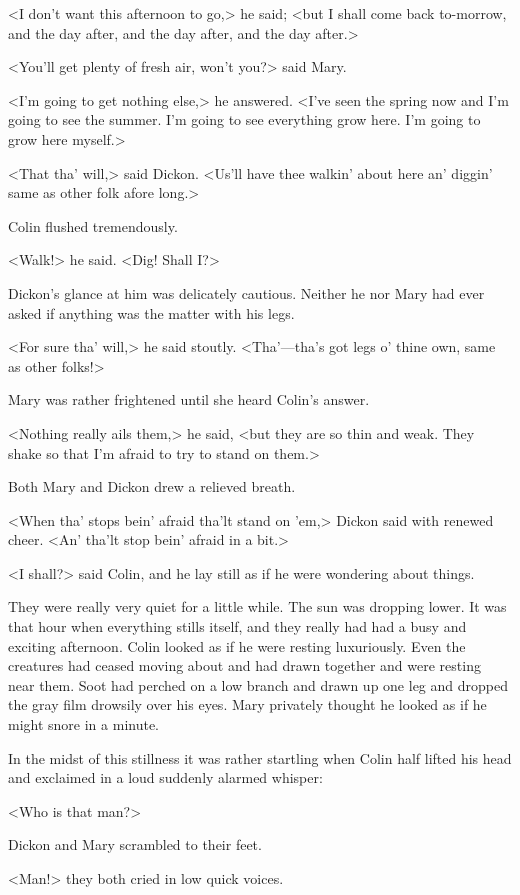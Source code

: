 <I don't want this afternoon to go,> he said; <but I shall come back to-morrow, and the day after, and the day after, and the day after.>

<You'll get plenty of fresh air, won't you?> said Mary.

<I'm going to get nothing else,> he answered. <I've seen the spring now and I'm going to see the summer. I'm going to see everything grow here. I'm going to grow here myself.>

<That tha' will,> said Dickon. <Us'll have thee walkin' about here an' diggin' same as other folk afore long.>

Colin flushed tremendously.

<Walk!> he said. <Dig! Shall I\@?>

Dickon's glance at him was delicately cautious. Neither he nor Mary had ever asked if anything was the matter with his legs.

<For sure tha' will,> he said stoutly. <Tha'—tha's got legs o' thine own, same as other folks!>

Mary was rather frightened until she heard Colin's answer.

<Nothing really ails them,> he said, <but they are so thin and weak. They shake so that I'm afraid to try to stand on them.>

Both Mary and Dickon drew a relieved breath.

<When tha' stops bein' afraid tha'lt stand on 'em,> Dickon said with renewed cheer. <An' tha'lt stop bein' afraid in a bit.>

<I shall?> said Colin, and he lay still as if he were wondering about things.

They were really very quiet for a little while. The sun was dropping lower. It was that hour when everything stills itself, and they really had had a busy and exciting afternoon. Colin looked as if he were resting luxuriously. Even the creatures had ceased moving about and had drawn together and were resting near them. Soot had perched on a low branch and drawn up one leg and dropped the gray film drowsily over his eyes. Mary privately thought he looked as if he might snore in a minute.

In the midst of this stillness it was rather startling when Colin half lifted his head and exclaimed in a loud suddenly alarmed whisper:

<Who is that man?>

Dickon and Mary scrambled to their feet.

<Man!> they both cried in low quick voices.

